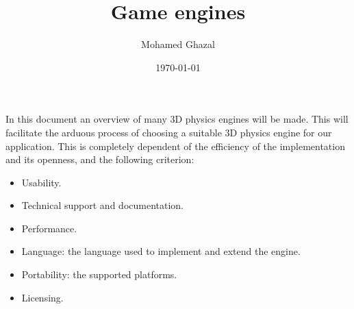 \documentclass[
	12pt, 
	a4paper, 
]{article}
\author{Mohamed Ghazal}
\title{Game engines}
\date{\today}
\begin{document}
	\maketitle
	In this document an overview of many 3D physics engines will be made. This will facilitate the arduous process of choosing a suitable 3D physics engine for our application. This is completely dependent of the efficiency of the implementation and its openness, and the following criterion:
	\begin{itemize}
		\item Usability.
		\item Technical support and documentation.
		\item Performance.
		\item Language: the language used to implement and extend the engine.
		\item Portability: the supported platforms.
		\item Licensing.
	\end{itemize}
\end{document}
